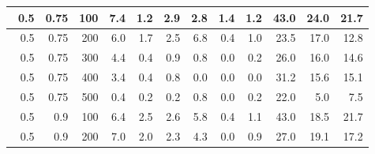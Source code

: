 \begin{longtable}{|r|r|r|r|r|r|r|r|r|r|r|r|}
        \hline \
        0.5                            & 0.75                    & 100                       & 7.4                       & 1.2                       & 2.9                       & 2.8                       & 1.4                       & 1.2                       & 43.0                      & 24.0                      & 21.7                      \\
        \hline \
        0.5                            & 0.75                    & 200                       & 6.0                       & 1.7                       & 2.5                       & 6.8                       & 0.4                       & 1.0                       & 23.5                      & 17.0                      & 12.8                      \\
        \hline \
        0.5                            & 0.75                    & 300                       & 4.4                       & 0.4                       & 0.9                       & 0.8                       & 0.0                       & 0.2                       & 26.0                      & 16.0                       & 14.6                       \\
        \hline \
        0.5                            & 0.75                     & 400                       & 3.4                       & 0.4                       & 0.8                       & 0.0                       & 0.0                       & 0.0                       & 31.2                      & 15.6                      & 15.1                      \\
        \hline \
        0.5                            & 0.75                     & 500                       & 0.4                       & 0.2                       & 0.2                       & 0.8                       & 0.0                       & 0.2                       & 22.0                      & 5.0                      & 7.5                      \\
        \hline \
        0.5                            & 0.9                     & 100                       & 6.4                       & 2.5                       & 2.6                       & 5.8                       & 0.4                       & 1.1                       & 43.0                      & 18.5                       & 21.7                       \\
        \hline \
        0.5                            & 0.9                     & 200                       & 7.0                       & 2.0                       & 2.3                       & 4.3                       & 0.0                       & 0.9                       & 27.0                      & 19.1                       & 17.2                       \\

\end{longtable}
